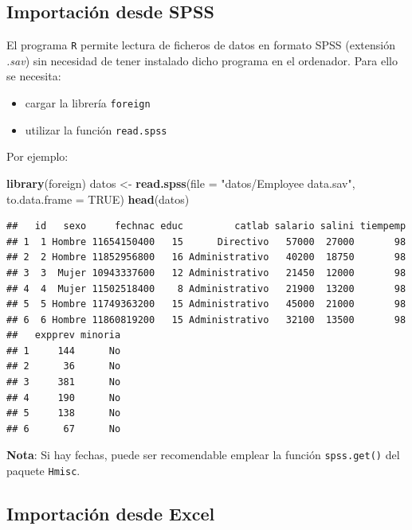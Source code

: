 \documentclass[]{book}
\newenvironment{Shaded}{\begin{snugshade}}{\end{snugshade}}
\newcommand{\KeywordTok}[1]{\textcolor[rgb]{0.13,0.29,0.53}{\textbf{#1}}}
\newcommand{\DataTypeTok}[1]{\textcolor[rgb]{0.13,0.29,0.53}{#1}}
\newcommand{\StringTok}[1]{\textcolor[rgb]{0.31,0.60,0.02}{#1}}
\newcommand{\OtherTok}[1]{\textcolor[rgb]{0.56,0.35,0.01}{#1}}
\newcommand{\NormalTok}[1]{#1}
\begin{document}
\subsection{Importación desde SPSS}\label{importacion-desde-spss}

El programa \texttt{R} permite lectura de ficheros de datos en formato
SPSS (extensión \emph{.sav}) sin necesidad de tener instalado dicho
programa en el ordenador. Para ello se necesita:

\begin{itemize}
\item
  cargar la librería \texttt{foreign}
\item
  utilizar la función \texttt{read.spss}
\end{itemize}

Por ejemplo:

\begin{Shaded}
\begin{Highlighting}[]
\KeywordTok{library}\NormalTok{(foreign)}
\NormalTok{datos <-}\StringTok{ }\KeywordTok{read.spss}\NormalTok{(}\DataTypeTok{file =} \StringTok{"datos/Employee data.sav"}\NormalTok{, }\DataTypeTok{to.data.frame =} \OtherTok{TRUE}\NormalTok{)}
\KeywordTok{head}\NormalTok{(datos)}
\end{Highlighting}
\end{Shaded}

\begin{verbatim}
##   id   sexo     fechnac educ         catlab salario salini tiempemp
## 1  1 Hombre 11654150400   15      Directivo   57000  27000       98
## 2  2 Hombre 11852956800   16 Administrativo   40200  18750       98
## 3  3  Mujer 10943337600   12 Administrativo   21450  12000       98
## 4  4  Mujer 11502518400    8 Administrativo   21900  13200       98
## 5  5 Hombre 11749363200   15 Administrativo   45000  21000       98
## 6  6 Hombre 11860819200   15 Administrativo   32100  13500       98
##   expprev minoria
## 1     144      No
## 2      36      No
## 3     381      No
## 4     190      No
## 5     138      No
## 6      67      No
\end{verbatim}

\textbf{Nota}: Si hay fechas, puede ser recomendable emplear la función
\texttt{spss.get()} del paquete \texttt{Hmisc}.

\subsection{Importación desde Excel}\label{importacion-desde-excel}
\end{document}
